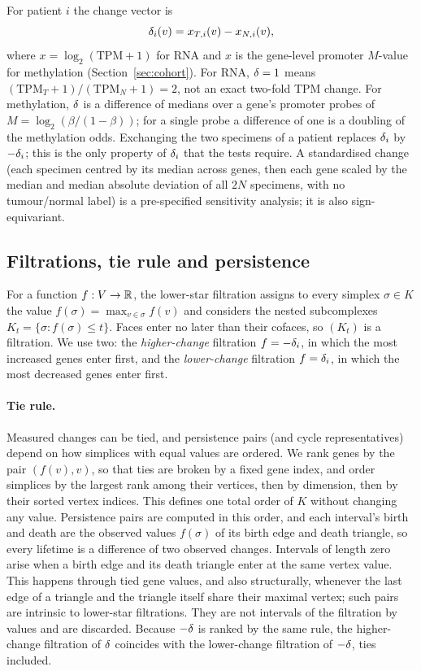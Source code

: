 For patient $i$ the change vector is
\begin{equation}\label{eq:delta}
\delta_i(v) = x_{T,i}(v) - x_{N,i}(v),
\end{equation}
where $x=\log_2(\mathrm{TPM}+1)$ for RNA and $x$ is the gene-level promoter $M$-value for methylation (Section~\ref{sec:cohort}). For RNA, $\delta=1$ means $(\mathrm{TPM}_T+1)/(\mathrm{TPM}_N+1)=2$, not an exact two-fold TPM change. For methylation, $\delta$ is a difference of medians over a gene's promoter probes of $M=\log_2(\beta/(1-\beta))$; for a single probe a difference of one is a doubling of the methylation odds. Exchanging the two specimens of a patient replaces $\delta_i$ by $-\delta_i$; this is the only property of $\delta_i$ that the tests require. A standardised change (each specimen centred by its median across genes, then each gene scaled by the median and median absolute deviation of all $2N$ specimens, with no tumour/normal label) is a pre-specified sensitivity analysis; it is also sign-equivariant.

\subsection{Filtrations, tie rule and persistence}\label{sec:ph}
For a function $f:V\to\mathbb{R}$, the lower-star filtration assigns to every simplex $\sigma\in K$ the value $f(\sigma)=\max_{v\in\sigma} f(v)$ and considers the nested subcomplexes $K_t=\{\sigma: f(\sigma)\le t\}$. Faces enter no later than their cofaces, so $(K_t)$ is a filtration. We use two: the \emph{higher-change} filtration $f=-\delta_i$, in which the most increased genes enter first, and the \emph{lower-change} filtration $f=\delta_i$, in which the most decreased genes enter first.

\paragraph{Tie rule.} Measured changes can be tied, and persistence pairs (and cycle representatives) depend on how simplices with equal values are ordered. We rank genes by the pair $(f(v), v)$, so that ties are broken by a fixed gene index, and order simplices by the largest rank among their vertices, then by dimension, then by their sorted vertex indices. This defines one total order of $K$ without changing any value. Persistence pairs are computed in this order, and each interval's birth and death are the observed values $f(\sigma)$ of its birth edge and death triangle, so every lifetime is a difference of two observed changes. Intervals of length zero arise when a birth edge and its death triangle enter at the same vertex value. This happens through tied gene values, and also structurally, whenever the last edge of a triangle and the triangle itself share their maximal vertex; such pairs are intrinsic to lower-star filtrations. They are not intervals of the filtration by values and are discarded. Because $-\delta$ is ranked by the same rule, the higher-change filtration of $\delta$ coincides with the lower-change filtration of $-\delta$, ties included.

